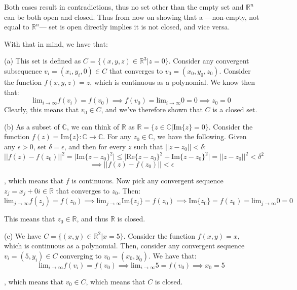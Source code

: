 \begin{solution}
    Both cases result in contradictions, thus no set other than the empty set and $\mathbb{R}^n$ can be both open and closed. Thus from now on showing that a ---non-empty, not equal to $\mathbb{R}^n$--- set is open directly implies it is not closed, and vice versa.

    With that in mind, we have that:

    (a) This set is defined as $C = \{(x, y, z) \in \mathbb{R}^3 \lvert z = 0\}$. Consider any convergent subsequence $v_i = (x_i, y_i, 0) \in C$ that converges to $v_0 = (x_0, y_0, z_0)$. Consider the function $f(x, y, z) = z$, which is continuous as a polynomial. We know then that:
    $$\text{lim}_{i \rightarrow \infty}f(v_i) = f(v_0) \implies f(v_0) = \text{lim}_{i \rightarrow \infty} 0 = 0 \implies z_0 = 0$$
    Clearly, this means that $v_0 \in C$, and we've therefore shown that $C$ is a closed set.

    (b) As a subset of $\mathbb{C}$, we can think of $\mathbb{R}$ as $\mathbb{R} = \{z \in \mathbb{C} \lvert \text{Im}\{z\} = 0\}$. Consider the function $f(z) = \text{Im}\{z\} : \mathbb{C} \rightarrow \mathbb{C}$. For any $z_0 \in \mathbb{C}$, we have the following. Given any $\epsilon > 0$, set $\delta = \epsilon$, and then for every $z$ such that $\lvert \lvert z - z_0 \rvert \rvert < \delta$:
    $$\lvert \lvert f(z) - f(z_0) \rvert \rvert^2 = \lvert \text{Im}\{z - z_0\}^2 \rvert \leq \lvert \text{Re}\{z - z_0\}^2 + \text{Im}\{z - z_0\}^2 \rvert = \lvert \lvert z - z_0 \rvert \rvert^2 < \delta^2$$
    $$\implies \lvert \lvert f(z) - f(z_0) \rvert \rvert < \epsilon$$

    , which means that $f$ is continuous. Now pick any convergent sequence $z_j = x_j + 0 i \in \mathbb{R}$ that converges to $z_0$. Then:
    $$\text{lim}_{j \rightarrow \infty} f(z_j) = f(z_0) \implies \text{lim}_{j \rightarrow \infty} \text{Im}\{z_j\} = f(z_0) \implies \text{Im}\{z_0\} = f(z_0) = \text{lim}_{j \rightarrow \infty} 0 = 0$$

    This means that $z_0 \in \mathbb{R}$, and thus $\mathbb{R}$ is closed.

    (c) We have $C = \{(x, y) \in \mathbb{R}^2 \lvert x = 5 \}$. Consider the function $f(x, y) = x$, which is continuous as a polynomial. Then, consider any convergent sequence $v_i = (5, y_i) \in C$ converging to $v_0 = (x_0, y_0)$. We have that:
    $$\text{lim}_{i \rightarrow \infty}f(v_i) = f(v_0) \implies \text{lim}_{i \rightarrow \infty} 5 = f(v_0) \implies x_0 = 5$$

    , which means that $v_0 \in C$, which means that $C$ is closed.


\end{solution}
